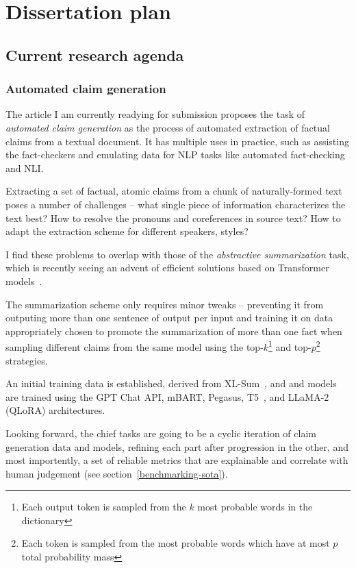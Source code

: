 
\chapter{Dissertation plan}
\label{chap:plan}


\section{Current research agenda}
\subsection{Automated claim generation}
\label{generation}

The article I am currently readying for submission proposes the task of \textit{automated claim generation} as the process of automated extraction of factual claims from a textual document. It has multiple uses in practice, such as assisting the fact-checkers and emulating data for NLP tasks like automated fact-checking and NLI.

Extracting a set of factual, atomic claims from a chunk of naturally-formed text poses a number of challenges -- what single piece of information characterizes the text best? 
How to resolve the pronouns and coreferences in source text?
How to adapt the extraction scheme for different speakers, styles?

I find these problems to overlap with those of the \textit{abstractive summarization} task, which is recently seeing an advent of efficient solutions based on Transformer models~\cite{pegasus,brio}.

The summarization scheme only requires minor tweaks -- preventing it from outputing more than one sentence of output per input and training it on data appropriately chosen to promote the summarization of more than one fact when sampling different claims from the same model using the top-$k$\footnote{Each output token is sampled from the $k$ most probable words in the dictionary} and top-$p$\footnote{Each token is sampled from the most probable words which have at most $p$ total probability mass}~\cite{topp} strategies.

An initial training data is established, derived from XL-Sum~\cite{xlsum}, \FEN and \CTK and models are trained using the GPT Chat API, mBART, Pegasus, T5~\cite{t5-11b}, and LLaMA-2 (QLoRA) architectures.

Looking forward, the chief tasks are going to be a cyclic iteration of claim generation data and models, refining each part after progression in the other, and most importently, a set of reliable metrics that are explainable and correlate with human judgement (see section~\ref{benchmarking-sota}).

